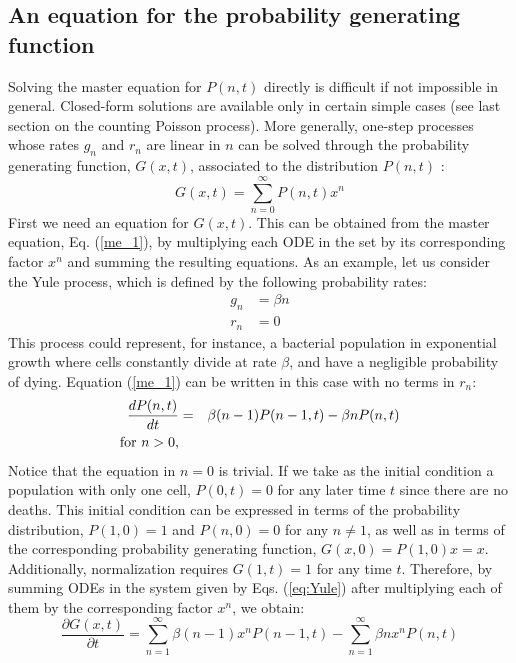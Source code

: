 \subsection{An equation for the probability generating function}
Solving the master equation for $P(n,t)$ directly is difficult if not impossible in general. Closed-form solutions are available only in certain simple cases (see last section on the counting Poisson process). More generally, one-step processes whose rates $g_n$ and $r_n$ are linear in $n$ can be solved through the probability generating function, $G(x,t)$, associated to the distribution $P(n,t)$ \citep{Kendall1948Logseries,Barlett60}:
\begin{equation}
G(x,t) = \sum_{n=0}^{\infty} P(n,t) x^n
\end{equation}
First we need an equation for $G(x,t)$. This can be obtained from the master equation, Eq. (\ref{me_1}), by multiplying each ODE in the set by its corresponding factor $x^n$ and summing the resulting equations. As an example, let us consider the Yule process, which is defined by the following probability rates:
\begin{align*}
g_n & = \beta n\\
r_n & = 0
\end{align*}
This process could represent, for instance, a bacterial population in exponential growth where cells constantly divide at rate $\beta$, and have a negligible probability of dying. Equation (\ref{me_1}) can be written in this case with no terms in $r_n$:    
\begin{eqnarray}
\frac{dP(n,t)}{dt}            & = & \beta (n-1) P(n-1,t) - \beta n P(n,t)         \nonumber \\
\textup{for} \,\, n > 0,      &   &                                               \label{eq:Yule}
\end{eqnarray}
Notice that the equation in $n=0$ is trivial. If we take as the initial condition a population with only one cell, $P(0,t) = 0$ for any later time $t$ since there are no deaths. This initial condition can be expressed in terms of the probability distribution, $P(1,0)=1$ and $P(n,0)=0$ for any $n \not = 1$, as well as in terms of the corresponding probability generating function, $G(x,0) = P(1,0) x = x$. Additionally, normalization requires $G(1,t) = 1$ for any time $t$. Therefore, by summing ODEs in the system given by Eqs. (\ref{eq:Yule}) after multiplying each of them by the corresponding factor $x^n$, we obtain:
\begin{equation}
\frac{\partial G(x,t)}{\partial t} = \sum_{n=1}^{\infty} \beta (n-1) x^n P(n-1,t) - \sum_{n=1}^{\infty} \beta n x^n P(n,t)
\end{equation}
